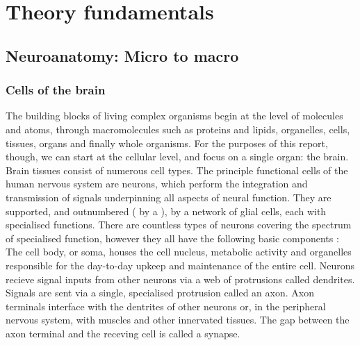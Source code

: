 
\chapter{Theory fundamentals}
\label{theory}


\section{Neuroanatomy: Micro to macro}

\subsection{Cells of the brain}


The building blocks of living complex organisms begin at the level of molecules and atoms, through macromolecules such as proteins and lipids, organelles, cells, tissues, organs and finally whole organisms.
For the purposes of this report, though, we can start at the cellular level, and focus on a single organ: the brain.
Brain tissues consist of numerous cell types.
The principle functional cells of the human nervous system are neurons, which perform the integration and transmission of signals underpinning all aspects of neural function.
They are supported, and outnumbered ( by a ), by a network of glial cells, each with specialised functions.
There are countless types of neurons covering the spectrum of specialised function, however they all have the following basic components :
The cell body, or soma, houses the cell nucleus, metabolic activity and organelles responsible for the day-to-day upkeep and maintenance of the entire cell.
Neurons recieve signal inputs from other neurons via a web of protrusions called dendrites. 
Signals are sent via a single, specialised protrusion called an axon.
Axon terminals interface with the dentrites of other neurons or, in the peripheral nervous system, with muscles and other innervated tissues.
The  gap between the axon terminal and the receving cell is called a synapse.


